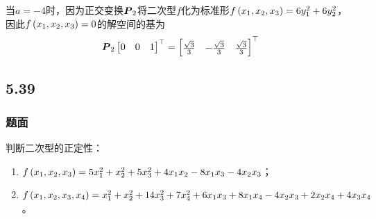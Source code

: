 \documentclass{beamer}
\begin{document}
\begin{frame}[allowframebreaks]
\begin{enumerate}
{              当\(a=-4\)时，因为正交变换\(\boldsymbol{P}_2\)将二次型\(f\)化为标准形\(f\left( x_1,x_2,x_3 \right)=6y_1^2+6y_2^2\)，因此\(f\left( x_1,x_2,x_3 \right)=0\)的解空间的基为
              \begin{equation*}
                  \boldsymbol{P}_2\begin{bmatrix}0&0&1\end{bmatrix}^\top=\begin{bmatrix}\frac{\sqrt{3}}{3}&-\frac{\sqrt{3}}{3}&\frac{\sqrt{3}}{3}\end{bmatrix}^\top
              \end{equation*}
              }
    \end{enumerate}
\end{frame}

\subsection*{5.39}
\begin{frame}
    \frametitle{题面}
    判断二次型的正定性：
    \begin{enumerate}
        \item \(f\left( x_1,x_2,x_3 \right)=5x_1^2+x_2^2+5x_3^2+4x_1x_2-8x_1x_3-4x_2x_3\)；
        \item \(f\left( x_1,x_2,x_3,x_4 \right)=x_1^2+x_2^2+14x_3^2+7x_4^2+6x_1x_3+8x_1x_4-4x_2x_3+2x_2x_4+4x_3x_4\)。
    \end{enumerate}
\end{frame}
\end{document}
